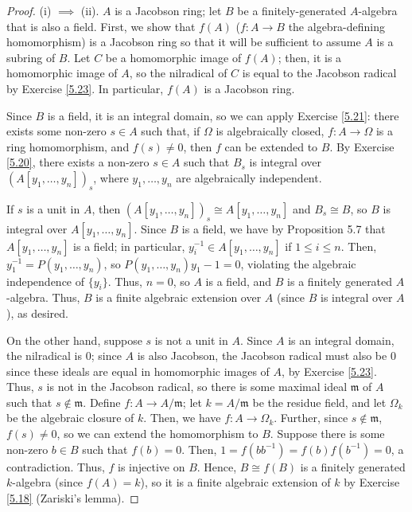 \begin{proof}
(i) $\implies$ (ii). $A$ is a Jacobson ring; let $B$ be a finitely-generated $A$-algebra that is also a field. First, we show that $f(A)$ ($f : A \to B$ the 
algebra-defining homomorphism) is a Jacobson ring so that it will be sufficient to assume $A$ is a subring of $B$. Let $C$ be a homomorphic image of $f(A)$; then, 
it is a homomorphic image of $A$, so the nilradical of $C$ is equal to the Jacobson radical by Exercise \ref{5.23}. In particular, $f(A)$ is a Jacobson ring.

Since $B$ is a field, it is an integral domain, so we can apply Exercise \ref{5.21}: there exists some non-zero $s \in A$ such that, if $\Omega$ is algebraically
closed, $f : A \to \Omega$ is a ring homomorphism, and $f(s) \neq 0$, then $f$ can be extended to $B$. By Exercise \ref{5.20},
there exists a non-zero $s \in A$ such that $B_s$ is integral over $(A[y_1,\ldots,y_n])_s$, where $y_1,\ldots,y_n$ are algebraically independent.

If $s$ is a unit in $A$, then $(A[y_1,\ldots,y_n])_s \cong A[y_1,\ldots,y_n]$ and $B_s \cong B$, so $B$ is integral over $A[y_1,\ldots,y_n]$. Since $B$ is a field,
we have by Proposition 5.7 that $A[y_1,\ldots,y_n]$ is a field; in particular, $y_i^{-1} \in A[y_1,\ldots,y_n]$ if $1 \le i \le n$. Then, $y_1^{-1} = P(y_1,\ldots,y_n)$, 
so $P(y_1,\ldots,y_n)y_1 - 1 = 0$, violating the algebraic independence of $\{y_i\}$. Thus, $n = 0$, so $A$ is a field,
and $B$ is a finitely generated $A$-algebra. Thus, $B$ is a finite algebraic extension over $A$ (since $B$ is integral over $A$), as desired.

On the other hand, suppose $s$ is not a unit in $A$. Since $A$ is an integral domain, the nilradical is $0$; since $A$ is also Jacobson, the Jacobson radical
must also be $0$ since these ideals are equal in homomorphic images of $A$, by Exercise \ref{5.23}. Thus, $s$ is not in the Jacobson radical, so there is some
maximal ideal $\mathfrak{m}$ of $A$ such that $s \not\in \mathfrak{m}$. Define $f : A \to A/\mathfrak{m}$; let $k = A/\mathfrak{m}$ be the residue field, and let
$\Omega_k$ be the algebraic closure of $k$. Then, we have $f : A \to \Omega_k$. Further, since $s \not\in \mathfrak{m}$, $f(s) \neq 0$, so we can extend the homomorphism
to $B$. Suppose there is some non-zero $b \in B$ such that $f(b) = 0$. Then, $1 = f(b b^{-1}) = f(b) f(b^{-1}) = 0$, a contradiction. Thus, $f$ is injective on $B$. Hence,
$B \cong f(B)$ is a finitely generated $k$-algebra (since $f(A) = k$), so it is a finite algebraic extension of $k$ by Exercise \ref{5.18} (Zariski's lemma).


\end{proof}
